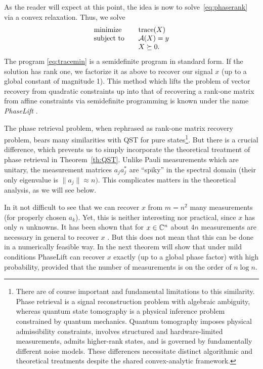 As the reader will expect at this point, the idea is now  to solve~\eqref{eq:phaserank} via a convex relaxation. 
Thus,  we solve
\begin{equation}
\label{eq:tracemin}
 \begin{array}{ll}
    \text{minimize}   & \quad \operatorname{trace}(X)\\
    \text{subject to} & \quad  {\mathcal A}(X) = y\\
& \quad X \succeq 0.
\end{array}
\end{equation}
The program \eqref{eq:tracemin} is a semidefinite program  in
standard form.
If the solution has rank one, we factorize it as above to recover our
signal $x$ (up to a global constant of magnitude 1).
This method which lifts the problem of vector recovery from
quadratic constraints up into that of recovering a rank-one matrix from
affine constraints via semidefinite programming is known under the
name {\em PhaseLift} \cite{CSV2013,CESV2013}.

The phase retrieval problem, when rephrased as rank-one matrix recovery problem, bears many similarities with QST for pure states\footnote{There are of course important and fundamental limitations to this similarity. Phase retrieval is a signal reconstruction problem with algebraic ambiguity, whereas quantum state tomography is a physical inference problem constrained by quantum mechanics. Quantum tomography imposes physical admissibility constraints, involves structured and hardware-limited measurements, admits higher-rank states, and is governed by fundamentally different noise models. These differences necessitate distinct algorithmic and theoretical treatments despite the shared convex-analytic framework.}. But there is a crucial difference, which prevents us to simply incorporate the theoretical treatment of phase retrieval in  Theorem~\ref{th:QST}.
Unlike Pauli measurements which are unitary, the measurement matrices $a_j a_j^*$ are ``spiky'' in the spectral domain (their only eigenvalue is $\|a_j\| \approx n)$. This complicates matters in the theoretical analysis, as we will see below.


In it not difficult to see that we can recover $x$ from $m=n^2$ many measurements (for properly chosen $a_k$). Yet, this is neither interesting nor practical, since $x$ has only $n$ unknowns. It has been shown that for $x \in \mathbb{C}^n$ about $4n$ measurements are necessary in general to recover $x$ \cite{balan2006signal,bandeira2014saving}. But this does not mean that this can be done in a numerically feasible way. In the next theorem will show that under mild conditions  PhaseLift can recover $x$ exactly (up to a global phase factor) with high probability, provided that the number of measurements is on the order of $n \log n$.




